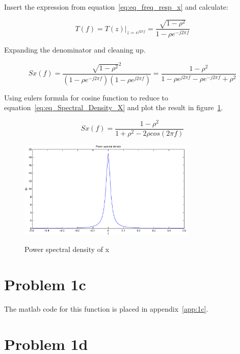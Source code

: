 	Insert the expression from equation~\ref{eq:eq_freq_resp_x} and calculate:
	
	\begin{equation*}
		T(f)=T(z)|_{z=e^{j2\pi f}}=\frac{\sqrt{1-\rho ^2}}{1-\rho e^{-j2\pi f}}
	\end{equation*}
	
	Expanding the denominator and cleaning up.
	
	\begin{equation*}
		Sx(f)=\frac{\sqrt{1-\rho ^2}^2}{(1-\rho e^{-j2\pi f})(1-\rho e^{j2\pi f})}=\frac{1-\rho ^2}{1-\rho e^{j2\pi f}-\rho e^{-j2\pi f}+\rho ^2}
	\end{equation*}
	
	Using eulers formula for cosine function to reduce to equation~\ref{eq:eq_Spectral_Density_X} and plot the result in figure~\ref{fig:power_spectral_density_x}.
	
	\begin{equation}
		Sx(f)=\frac{1-\rho ^2}{1+\rho ^2-2\rho cos(2\pi f)}
		\label{eq:eq_Spectral_Density_X}
	\end{equation}
	
	\begin{figure}
	  \centering
	  \includegraphics[width=0.75\textwidth]{img/Oppgave1b}
	  \label{fig:power_spectral_density_x}
	  \caption{Power spectral density of x}
	\end{figure}
  
  \section{Problem 1c}
	The matlab code for this function is placed in appendix~\ref{app:1c}.
	
  
  \section{Problem 1d}
	
